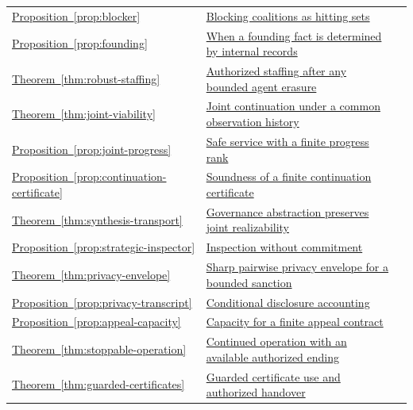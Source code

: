\begin{longtable}{@{}P{.19\linewidth}P{.69\linewidth}r@{}}
\hyperref[prop:blocker]{Proposition~\ref*{prop:blocker}} & \hyperref[prop:blocker]{Blocking coalitions as hitting sets} & \pageref{prop:blocker}\\
\hyperref[prop:founding]{Proposition~\ref*{prop:founding}} & \hyperref[prop:founding]{When a founding fact is determined by internal records} & \pageref{prop:founding}\\
\hyperref[thm:robust-staffing]{Theorem~\ref*{thm:robust-staffing}} & \hyperref[thm:robust-staffing]{Authorized staffing after any bounded agent erasure} & \pageref{thm:robust-staffing}\\
\hyperref[thm:joint-viability]{Theorem~\ref*{thm:joint-viability}} & \hyperref[thm:joint-viability]{Joint continuation under a common observation history} & \pageref{thm:joint-viability}\\
\hyperref[prop:joint-progress]{Proposition~\ref*{prop:joint-progress}} & \hyperref[prop:joint-progress]{Safe service with a finite progress rank} & \pageref{prop:joint-progress}\\
\hyperref[prop:continuation-certificate]{Proposition~\ref*{prop:continuation-certificate}} & \hyperref[prop:continuation-certificate]{Soundness of a finite continuation certificate} & \pageref{prop:continuation-certificate}\\
\hyperref[thm:synthesis-transport]{Theorem~\ref*{thm:synthesis-transport}} & \hyperref[thm:synthesis-transport]{Governance abstraction preserves joint realizability} & \pageref{thm:synthesis-transport}\\
\hyperref[prop:strategic-inspector]{Proposition~\ref*{prop:strategic-inspector}} & \hyperref[prop:strategic-inspector]{Inspection without commitment} & \pageref{prop:strategic-inspector}\\
\hyperref[thm:privacy-envelope]{Theorem~\ref*{thm:privacy-envelope}} & \hyperref[thm:privacy-envelope]{Sharp pairwise privacy envelope for a bounded sanction} & \pageref{thm:privacy-envelope}\\
\hyperref[prop:privacy-transcript]{Proposition~\ref*{prop:privacy-transcript}} & \hyperref[prop:privacy-transcript]{Conditional disclosure accounting} & \pageref{prop:privacy-transcript}\\
\hyperref[prop:appeal-capacity]{Proposition~\ref*{prop:appeal-capacity}} & \hyperref[prop:appeal-capacity]{Capacity for a finite appeal contract} & \pageref{prop:appeal-capacity}\\
\hyperref[thm:stoppable-operation]{Theorem~\ref*{thm:stoppable-operation}} & \hyperref[thm:stoppable-operation]{Continued operation with an available authorized ending} & \pageref{thm:stoppable-operation}\\
\hyperref[thm:guarded-certificates]{Theorem~\ref*{thm:guarded-certificates}} & \hyperref[thm:guarded-certificates]{Guarded certificate use and authorized handover} & \pageref{thm:guarded-certificates}\\
\end{longtable}
\endgroup
